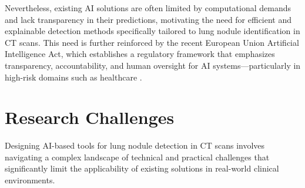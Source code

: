Nevertheless, existing AI solutions are often limited by computational demands and lack transparency in their predictions, motivating the need for efficient and explainable detection methods specifically tailored to lung nodule identification in CT scans.
This need is further reinforced by the recent European Union Artificial Intelligence Act, which establishes a regulatory framework that emphasizes transparency, accountability, and human oversight for AI systems—particularly in high-risk domains such as healthcare \cite{eu_ai_act}.

\section{Research Challenges}

Designing AI-based tools for lung nodule detection in CT scans involves navigating a complex landscape of technical and practical challenges that significantly limit the applicability of existing solutions in real-world clinical environments.

